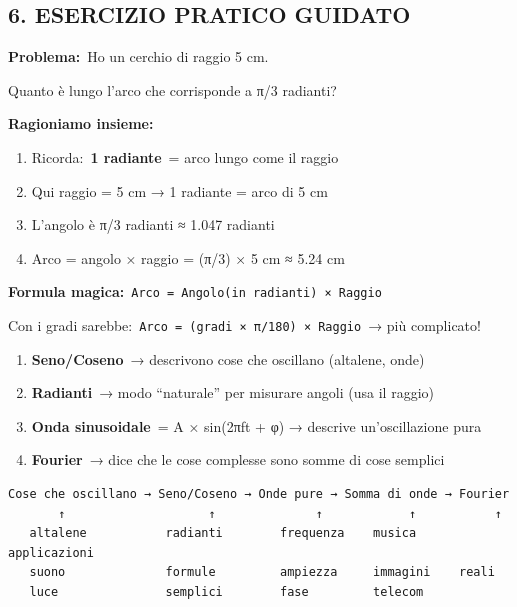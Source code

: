 \documentclass[
]{article}
\providecommand{\tightlist}{%
  \setlength{\itemsep}{0pt}\setlength{\parskip}{0pt}}
\begin{document}
\hypertarget{esercizio-pratico-guidato}{%
\subsection{\texorpdfstring{\textbf{6. ESERCIZIO PRATICO GUIDATO}}{6. ESERCIZIO PRATICO GUIDATO}}\label{esercizio-pratico-guidato}}

\textbf{Problema:}~Ho un cerchio di raggio 5 cm.

Quanto è lungo l'arco che corrisponde a π/3 radianti?

\textbf{Ragioniamo insieme:}

\begin{enumerate}
\def\labelenumi{\arabic{enumi}.}
\tightlist
\item
  Ricorda:~\textbf{1 radiante}~= arco lungo come il raggio
\item
  Qui raggio = 5 cm → 1 radiante = arco di 5 cm
\item
  L'angolo è π/3 radianti ≈ 1.047 radianti
\item
  Arco = angolo × raggio = (π/3) × 5 cm ≈ 5.24 cm
\end{enumerate}

\textbf{Formula magica:}~\texttt{Arco\ =\ Angolo(in\ radianti)\ ×\ Raggio}

Con i gradi sarebbe:~\texttt{Arco\ =\ (gradi\ ×\ π/180)\ ×\ Raggio}~→ più complicato!

\begin{enumerate}
\def\labelenumi{\arabic{enumi}.}
\tightlist
\item
  \textbf{Seno/Coseno}~→ descrivono cose che oscillano (altalene, onde)
\item
  \textbf{Radianti}~→ modo ``naturale'' per misurare angoli (usa il raggio)
\item
  \textbf{Onda sinusoidale}~= A × sin(2πft + φ) → descrive un'oscillazione pura
\item
  \textbf{Fourier}~→ dice che le cose complesse sono somme di cose semplici
\end{enumerate}

\begin{verbatim}
Cose che oscillano → Seno/Coseno → Onde pure → Somma di onde → Fourier
       ↑                    ↑              ↑            ↑           ↑
   altalene           radianti        frequenza    musica      applicazioni
   suono              formule         ampiezza     immagini    reali
   luce               semplici        fase         telecom
\end{verbatim}
\end{document}

